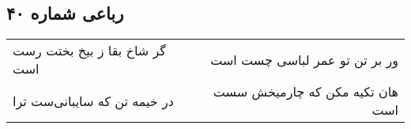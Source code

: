 \begin{center}
\section*{رباعی شماره ۴۰}
\label{sec:sh040}
\begin{longtable}{l p{0.5cm} r}
گر شاخ بقا ز بیخ بختت رست است
&&
ور بر تن تو عمر لباسی چست است
\\
در خیمه تن که سایبانی‌ست ترا
&&
هان تکیه مکن که چارمیخش سست است
\\
\end{longtable}
\end{center}
